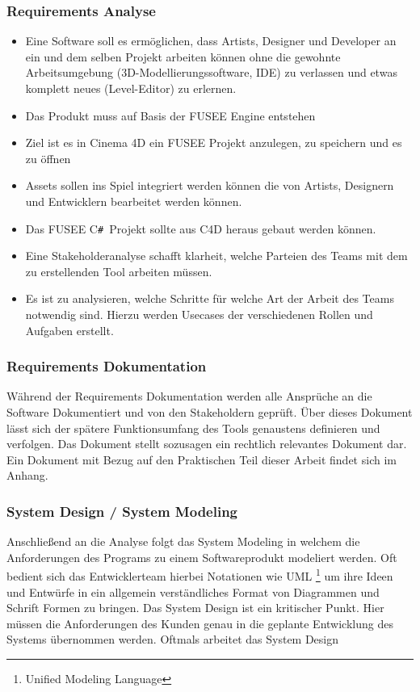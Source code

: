 \documentclass[pagesize, paper=a4, fontsize=12pt,titlepage=true, headings=small, headnosepline, abstractoff, liststotoc, nochapterprefix, plainheadsepline, twoside]{scrreprt}
\newcommand{\CSS}{C\texttt{\# }}
\begin{document}
\subsubsection{Requirements Analyse}
\begin{itemize}
\item Eine Software soll es ermöglichen, dass Artists, Designer und Developer an ein und dem selben Projekt arbeiten können ohne die gewohnte Arbeitsumgebung (3D-Modellierungssoftware, IDE) zu verlassen und etwas komplett neues (Level-Editor) zu erlernen.
\item Das Produkt muss auf Basis der FUSEE Engine entstehen
\item Ziel ist es in Cinema 4D ein FUSEE Projekt anzulegen, zu speichern und es zu öffnen
\item Assets sollen ins Spiel integriert werden können die von Artists, Designern und Entwicklern bearbeitet werden können.
\item Das FUSEE \CSS Projekt sollte aus C4D heraus gebaut werden können.
\item Eine Stakeholderanalyse schafft klarheit, welche Parteien des Teams mit dem zu erstellenden Tool arbeiten müssen.
\item Es ist zu analysieren, welche Schritte für welche Art der Arbeit des Teams notwendig sind. Hierzu werden Usecases der verschiedenen Rollen und Aufgaben erstellt.
\end{itemize}
\subsubsection{Requirements Dokumentation}
Während der Requirements Dokumentation werden alle Ansprüche an die Software Dokumentiert und von den Stakeholdern geprüft. Über dieses Dokument lässt sich der spätere Funktionsumfang des Tools genaustens definieren und verfolgen. Das Dokument stellt sozusagen ein rechtlich relevantes Dokument dar. Ein Dokument mit Bezug auf den Praktischen Teil dieser Arbeit findet sich im Anhang.

\subsubsection{System Design / System Modeling}
Anschließend an die Analyse folgt das System Modeling in welchem die Anforderungen des Programs zu einem Softwareprodukt modeliert werden. Oft bedient sich das Entwicklerteam hierbei Notationen wie UML \footnote{Unified Modeling Language} um ihre Ideen und Entwürfe in ein allgemein verständliches Format von Diagrammen und Schrift Formen zu bringen. Das System Design ist ein kritischer Punkt. Hier müssen die Anforderungen des Kunden genau in die geplante Entwicklung des Systems übernommen werden. Oftmals arbeitet das System Design 
\end{document}

